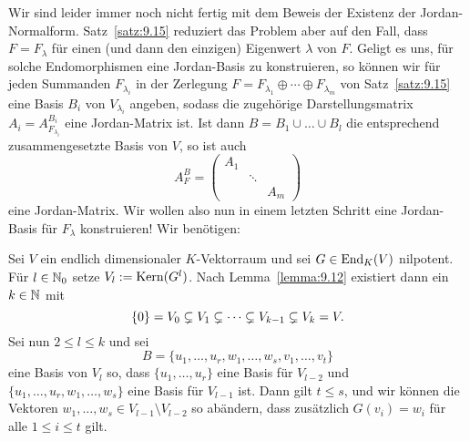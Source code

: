\begin{bemerkung}
	\label{bem:9.16}
	Wir sind leider immer noch nicht fertig mit dem Beweis der Existenz der Jordan-Normalform.
	Satz~\ref{satz:9.15} reduziert das Problem aber auf den Fall, dass $F = F_\lambda$ für einen (und dann den einzigen) Eigenwert $\lambda$ von $F$.
	Geligt es uns, für solche Endomorphismen eine Jordan-Basis zu konstruieren, so können wir für jeden Summanden $F_{\lambda_i}$ in der Zerlegung $F = F_{\lambda_1} \oplus \cdots \oplus F_{\lambda_m}$ von Satz~\ref{satz:9.15} eine Basis $B_i$ von $V_{\lambda_i}$ angeben, sodass die zugehörige Darstellungsmatrix $A_i = A^{B_i}_{F_{\lambda_i}}$ eine Jordan-Matrix ist.
	Ist dann $B = B_1 \cup \dots \cup B_l$ die entsprechend zusammengesetzte Basis von $V$, so ist auch
	\[
		A_F^B = \begin{pmatrix}
			A_1 & & \\
			 & \ddots & \\
			 & & A_m
		\end{pmatrix}
	\]
	eine Jordan-Matrix.
	Wir wollen also nun in einem letzten Schritt eine Jordan-Basis für $F_\lambda$ konstruieren! Wir benötigen:
\end{bemerkung}

\begin{lemma}
	\label{lemma:9.17}
	Sei $V$ ein endlich dimensionaler $K$-Vektorraum und sei $G \in \operatorname{End}_K(V)$ nilpotent.
	Für $l \in \mathbb{N}_0$ setze $V_l := \operatorname{Kern}(G^l)$.
	Nach Lemma~\ref{lemma:9.12} existiert dann ein $k \in \mathbb{N}$ mit
	\[
		\{0\} = V_0 \subsetneq V_1 \subsetneq \cdots \subsetneq V_{k-1} \subsetneq V_k = V.
	\]
	Sei nun $2 \leq l \leq k$ und sei
	\[
		B = \{u_1,\dots,u_r,w_1,\dots,w_s,v_1,\dots,v_t\}
	\]
	eine Basis von $V_l$ so, dass $\{u_1,\dots,u_r\}$ eine Basis für $V_{l-2}$ und $\{u_1,\dots,u_r,w_1,\dots,w_s\}$ eine Basis für $V_{l-1}$ ist.
	Dann gilt $t \leq s$, und wir können die Vektoren $w_1,\dots,w_s \in V_{l-1} \setminus V_{l-2}$ so abändern, dass zusätzlich $G(v_i) = w_i$ für alle $1 \leq i \leq t$ gilt.
\end{lemma}

